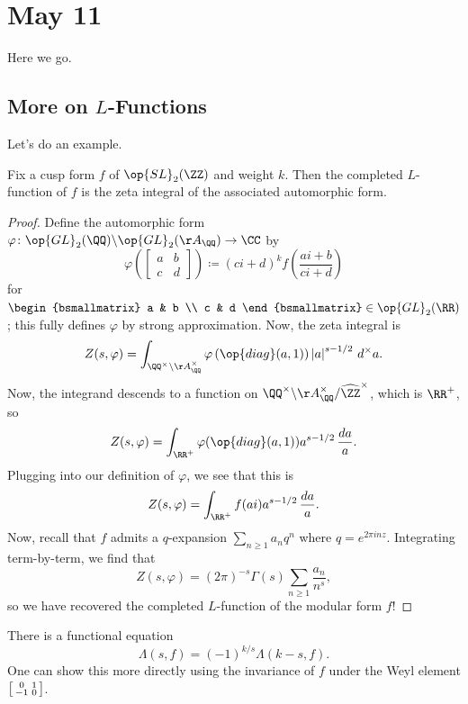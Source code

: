 \documentclass[../notes.tex]{subfiles}
\begin{document}
\section{May 11}
Here we go.

\subsection{More on \texorpdfstring{$L$}{ L}-Functions}
Let's do an example.
\begin{exe}
	Fix a cusp form $f$ of $\op{SL}_2(\ZZ)$ and weight $k$. Then the completed $L$-function of $f$ is the zeta integral of the associated automorphic form.
\end{exe}
\begin{proof}
	Define the automorphic form $\varphi\colon\op{GL}_2(\QQ)\backslash\op{GL}_2(\AA_\QQ)\to\CC$ by
	\[\varphi\left(\begin{bmatrix}
		a & b \\ c & d
	\end{bmatrix}\right)\coloneqq(ci+d)^kf\left(\frac{ai+b}{ci+d}\right)\]
	for $\begin{bsmallmatrix}
		a & b \\ c & d
	\end{bsmallmatrix}\in\op{GL}_2(\RR)$; this fully defines $\varphi$ by strong approximation. Now, the zeta integral is
	\[Z(s,\varphi)=\int_{\QQ^\times\backslash\AA_\QQ^\times}\varphi\left(\op{diag}(a,1)\right)\left|a\right|^{s-1/2}\,d^\times a.\]
	Now, the integrand descends to a function on $\QQ^\times\backslash\AA_\QQ^\times/\widehat\ZZ^\times$, which is $\RR^+$, so
	\[Z(s,\varphi)=\int_{\RR^+}\varphi(\op{diag}(a,1))a^{s-1/2}\,\frac{da}a.\]
	Plugging into our definition of $\varphi$, we see that this is
	\[Z(s,\varphi)=\int_{\RR^+}f(ai)a^{s-1/2}\,\frac{da}a.\]
	Now, recall that $f$ admits a $q$-expansion $\sum_{n\ge1}a_nq^n$ where $q=e^{2\pi inz}$. Integrating term-by-term, we find that
	\[Z(s,\varphi)=(2\pi)^{-s}\Gamma(s)\sum_{n\ge1}\frac{a_n}{n^s},\]
	so we have recovered the completed $L$-function of the modular form $f$!
\end{proof}
\begin{remark}
	There is a functional equation
	\[\Lambda(s,f)=(-1)^{k/s}\Lambda(k-s,f).\]
	One can show this more directly using the invariance of $f$ under the Weyl element $\begin{bsmallmatrix}
		0 & 1 \\ -1 & 0
	\end{bsmallmatrix}$.
\end{remark}
\end{document}
